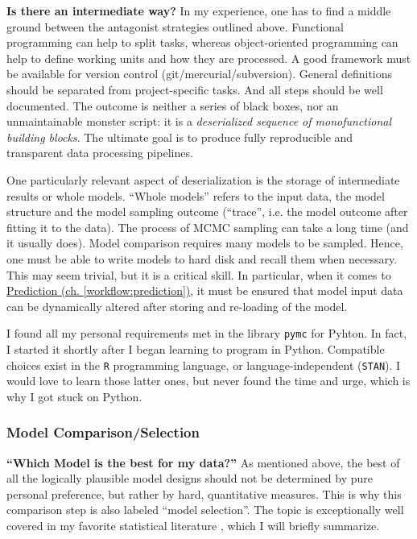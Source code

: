 \textbf{Is there an intermediate way?}
In my experience, one has to find a middle ground between the antagonist strategies outlined above.
Functional programming can help to split tasks, whereas object-oriented programming can help to define working units and how they are processed.
A good framework must be available for version control (git/mercurial/subversion).
General definitions should be separated from project-specific tasks.
And all steps should be well documented.
The outcome is neither a series of black boxes, nor an unmaintainable monster script: it is a \emph{deserialized sequence of monofunctional building blocks}.
The ultimate goal is to produce fully reproducible and transparent data processing pipelines.


One particularly relevant aspect of deserialization is the storage of intermediate results or whole models.
``Whole models'' refers to the input data, the model structure and the model sampling outcome (``trace'', i.e. the model outcome after fitting it to the data).
The process of MCMC sampling can take a long time (and it usually does).
Model comparison requires many models to be sampled.
Hence, one must be able to write models to hard disk and recall them when necessary.
This may seem trivial, but it is a critical skill.
In particular, when it comes to \hyperref[workflow:prediction]{Prediction (ch. \ref{workflow:prediction})}, it must be ensured that model input data can be dynamically altered after storing and re-loading of the model.

I found all my personal requirements met in the library \texttt{pymc} for Pyhton.
In fact, I started it shortly after I began learning to program in Python.
Compatible choices exist in the \texttt{R} programming language, or language-independent (\texttt{STAN}).
I would love to learn those latter ones, but never found the time and urge, which is why I got stuck on Python.


\subsubsection{Model Comparison/Selection}
\label{workflow:comparison}
\textbf{``Which Model is the best for my data?''}
As mentioned above, the best of all the logically plausible model designs should not be determined by pure personal preference, but rather by hard, quantitative measures.
This is why this comparison step is also labeled ``model selection''.
The topic is exceptionally well covered in my favorite statistical literature \citep[][ch. 11]{McElreath2018}, which I will briefly summarize.

